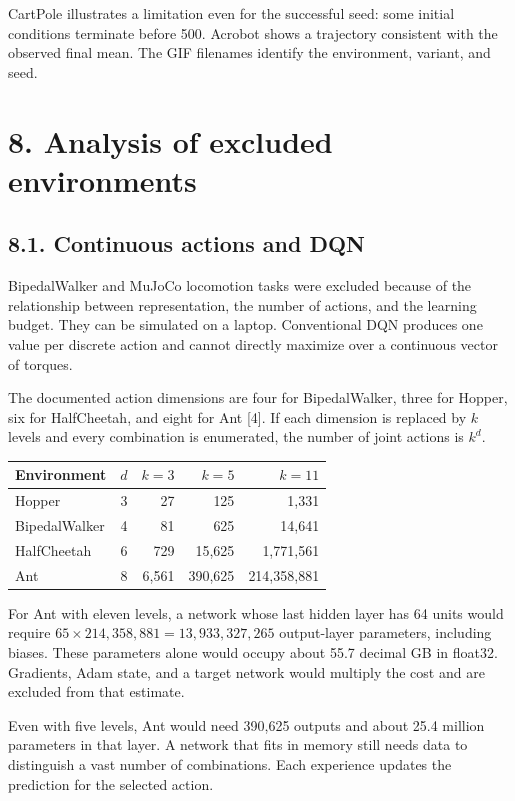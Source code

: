 \documentclass[10pt,a4paper,twocolumn]{extarticle}
\newenvironment{reporttable}
 {\par\noindent\begin{minipage}{\columnwidth}\small\renewcommand{\arraystretch}{1.13}}
 {\end{minipage}\par}
\begin{document}
CartPole illustrates a limitation even for the successful seed: some initial conditions terminate before 500. Acrobot shows a trajectory consistent with the observed final mean. The GIF filenames identify the environment, variant, and seed.

\clearpage
\section*{8. Analysis of excluded environments}
\subsection*{8.1. Continuous actions and DQN}
BipedalWalker and MuJoCo locomotion tasks were excluded because of the relationship between representation, the number of actions, and the learning budget. They can be simulated on a laptop. Conventional DQN produces one value per discrete action and cannot directly maximize over a continuous vector of torques.

The documented action dimensions are four for BipedalWalker, three for Hopper, six for HalfCheetah, and eight for Ant [4]. If each dimension is replaced by $k$ levels and every combination is enumerated, the number of joint actions is $k^d$.

\begin{reporttable}
\begin{tabularx}{\linewidth}{@{}Xrrrr@{}}
\toprule
Environment & $d$ & $k=3$ & $k=5$ & $k=11$ \\
\midrule
Hopper & 3 & 27 & 125 & 1,331 \\
BipedalWalker & 4 & 81 & 625 & 14,641 \\
HalfCheetah & 6 & 729 & 15,625 & 1,771,561 \\
Ant & 8 & 6,561 & 390,625 & 214,358,881 \\
\bottomrule
\end{tabularx}
\end{reporttable}

For Ant with eleven levels, a network whose last hidden layer has 64 units would require $65\times214{,}358{,}881=13{,}933{,}327{,}265$ output-layer parameters, including biases. These parameters alone would occupy about 55.7 decimal GB in float32. Gradients, Adam state, and a target network would multiply the cost and are excluded from that estimate.

Even with five levels, Ant would need 390,625 outputs and about 25.4 million parameters in that layer. A network that fits in memory still needs data to distinguish a vast number of combinations. Each experience updates the prediction for the selected action.
\end{document}

